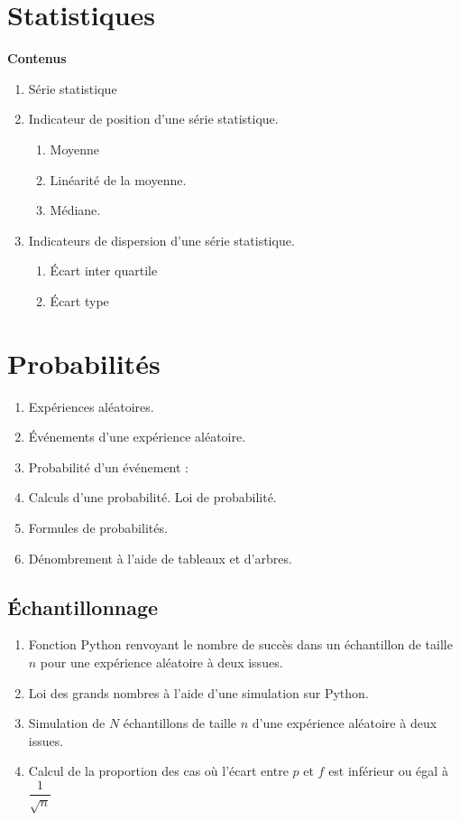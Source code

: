 \documentclass[10pt,a4paper]{article}
\begin{document}
 
\section{Statistiques}

\textbf{Contenus}

\begin{enumerate}
\item Série statistique
\item Indicateur de position d'une série statistique.
\begin{enumerate}
\item Moyenne
\item Linéarité de la moyenne.
\item Médiane.
\end{enumerate}
\item Indicateurs de dispersion  d'une série statistique.
\begin{enumerate}
\item Écart inter quartile
\item Écart type
\end{enumerate}
\end{enumerate}

 
\section{Probabilités}


\begin{enumerate}
\item Expériences aléatoires.
\item Événements d'une expérience aléatoire.
\item Probabilité d'un événement : 
\item Calculs d'une probabilité. Loi de probabilité.
\item Formules de probabilités.
\item Dénombrement à l'aide de tableaux et d'arbres.
\end{enumerate}

  
\subsection*{Échantillonnage}

 
\begin{enumerate} 
\item Fonction Python renvoyant le nombre de succès dans un échantillon de taille $n$ pour une expérience aléatoire à deux issues.
\item Loi des grands nombres à l'aide d'une simulation sur Python.
\item Simulation de $N$ échantillons de taille $n$ d'une expérience aléatoire à deux issues.  
\item Calcul de la proportion des cas où l'écart entre $p$ et $f$ est inférieur ou égal à $\dfrac{1}{\sqrt n}$
\end{enumerate}
\end{document}
